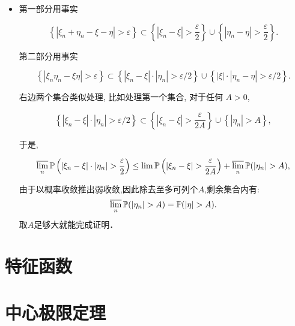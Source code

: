 \begin{itemize}
这个子列存在 $a. \ s.$收敛(因而依概率收敛)的子列,矛盾.

\item[7.]

第一部分用事实

$$\left\{\left|\xi_{n}+\eta_{n}-\xi-\eta\right|>\varepsilon\right\} \subset\left\{\left|\xi_{n}-\xi\right|>\frac{\varepsilon}{2}\right\} \cup\left\{\left|\eta_{n}-\eta\right|>\frac{\varepsilon}{2}\right\}.$$

第二部分用事实

$$\left\{\left|\xi_{n} \eta_{n}-\xi \eta\right|>\varepsilon\right\} \subset\left\{\left|\xi_{n}-\xi\right| \cdot\left|\eta_{n}\right|>\varepsilon / 2\right\} \cup\left\{|\xi| \cdot\left|\eta_{n}-\eta\right|>\varepsilon / 2\right\}.$$

右边两个集合类似处理, 比如处理第一个集合, 对于任何  $A>0$,

$$\left\{\left|\xi_{n}-\xi\right| \cdot\left|\eta_{n}\right|>\varepsilon / 2\right\} \subset\left\{\left|\xi_{n}-\xi\right|>\frac{\varepsilon}{2 A}\right\} \cup\left\{\left|\eta_{n}\right|>A\right\},$$

于是,

$$\varlimsup_{n} \mathbb{P}\left(\left|\xi_{n}-\xi\right| \cdot\left|\eta_{n}\right|>\frac{\varepsilon}{2}\right) \leq \lim \mathbb{P}\left(\left|\xi_{n}-\xi\right|>\frac{\varepsilon}{2 A}\right)+\varlimsup_{n} \mathbb{P}(\left|\eta_{n}\right|>A),$$

由于以概率收敛推出弱收敛,因此除去至多可列个$A$,剩余集合内有:
$$ \varlimsup_n  \mathbb{P}(\left|\eta_{n}\right|>A)=\mathbb{P}(|\eta|>  A).$$
取$A$足够大就能完成证明．
\end{itemize}

\section{特征函数}

\section{中心极限定理}

